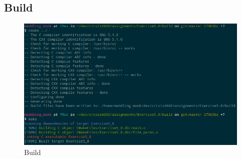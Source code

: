 \documentclass[a4paper,12pt,sffamily]{article}
\begin{document}
\subsection{Build}
\begin{figure}[H]
\centering
\includegraphics[width=1\linewidth]{./images/0}
\caption[build_1]{Build}
\label{fig:11}
\end{figure}
\end{document}
